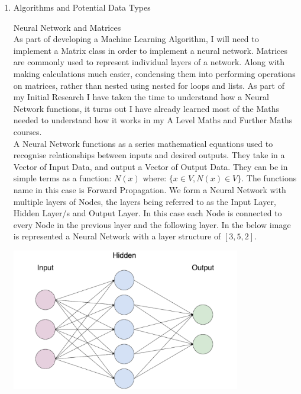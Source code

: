 \begin{flushleft}
\begin{enumerate}
\begin{enumerate}
\begin{enumerate}
                        \vspace{1cm}
                \end{enumerate}

                \item {\Large Algorithms and Potential Data Types} \\
                    \large
                    \vspace{0.2cm}
                    
                    {\Large Neural Network and Matrices} \\
                    As part of developing a Machine Learning Algorithm, I will need to implement a Matrix class in order to
                    implement a neural network. Matrices are commonly used to represent individual layers of a network. Along
                    with making calculations much easier, condensing them into performing operations on matrices, rather than
                    nested using nested for loops and lists. As part of my Initial Research I have taken the time to understand
                    how a Neural Network functions, it turns out I have already learned most of the Maths needed to understand
                    how it works in my A Level Maths and Further Maths courses. \\
                    \vspace{0.2cm}
                    A Neural Network functions as a series mathematical equations used to recognise relationships between inputs
                    and desired outputs. They take in a Vector of Input Data, and output a Vector of Output Data. They can be
                    in simple terms as a function: $N(x)$ where: $\{x \in V, N(x) \in V\}$. The functions name in this case is
                    Forward Propagation. 
                    \vspace{0.2cm}
                    We form a Neural Network with multiple layers of Nodes, the layers being referred to as the Input Layer, 
                    Hidden Layer/s and Output Layer. In this case each Node is connected to every Node in the previous layer and
                    the following layer. In the below image is represented a Neural Network with a layer structure of $[3, 5, 2]$.

                    \vspace{0.1cm}
                    \centerline{\includegraphics[width=10cm]{Images/InitialResearch/NeuralNetworkExample.png}}


\end{enumerate}
\end{enumerate}
\end{flushleft}
